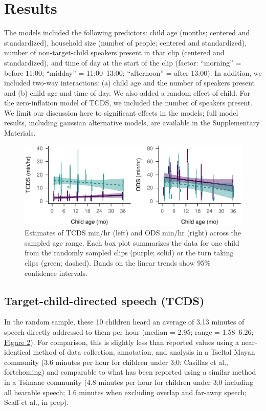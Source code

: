\documentclass[,man,floatsintext]{apa6}
\begin{document}
\section{Results}\label{results}

The models included the following predictors: child age (months;
centered and standardized), household size (number of people; centered
and standardized), number of non-target-child speakers present in that
clip (centered and standardized), and time of day at the start of the
clip (factor: \enquote{morning} = before 11:00; \enquote{midday} =
11:00--13:00; \enquote{afternoon} = after 13:00). In addition, we
included two-way interactions: (a) child age and the number of speakers
present and (b) child age and time of day. We also added a random effect
of child. For the zero-inflation model of TCDS, we included the number
of speakers present. We limit our discussion here to significant effects
in the models; full model results, including gaussian alternative
models, are available in the Supplementary Materials.

\begin{figure}
\centering
\includegraphics{Yeli-CLE_files/figure-latex/fig2-1.pdf}
\caption{\label{fig:fig2}Estimates of TCDS min/hr (left) and ODS min/hr
(right) across the sampled age range. Each box plot summarizes the data
for one child from the randomly sampled clips (purple; solid) or the
turn taking clips (green; dashed). Bands on the linear trends show 95\%
confidence intervals.}
\end{figure}

\subsection{Target-child-directed speech
(TCDS)}\label{target-child-directed-speech-tcds}

In the random sample, these 10 children heard an average of 3.13 minutes
of speech directly addressed to them per hour (median = 2.95; range =
1.58--6.26; \protect\hyperlink{fig2}{Figure 2}). For comparison, this is
slightly less than reported values using a near-identical method of data
collection, annotation, and analysis in a Tseltal Mayan community (3.6
minutes per hour for children under 3;0; Casillas et al., fortchoming)
and comparable to what has been reported using a similar method in a
Tsimane community (4.8 minutes per hour for children under 3;0 including
all hearable speech; 1.6 minutes when excluding overlap and far-away
speech; Scaff et al., in prep).
\end{document}
